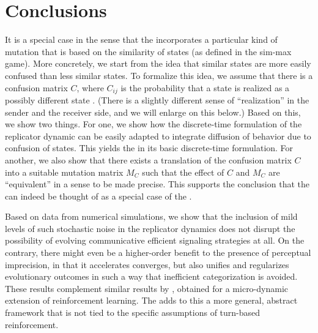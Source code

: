 \section{Conclusions}
\label{sec:conclusions}

It is a special case in the sense that the \rdd incorporates a
particular kind of mutation that is based on the similarity of states
(as defined in the sim-max game). More concretely, we start from the
idea that similar states are more easily confused than less similar
states. To formalize this idea, we assume that there is a confusion
matrix $C$, where $C_{ij}$ is the probability that a state 
is realized as a possibly different state . (There is a
slightly different sense of ``realization'' in the sender and the
receiver side, and we will enlarge on this below.) Based on this, we
show two things. For one, we show how the discrete-time formulation of
the replicator dynamic can be easily adapted to integrate diffusion of
behavior due to confusion of states. This yields the \rdd in its basic
discrete-time formulation. For another, we also show that there exists
a translation of the confusion matrix $C$ into a suitable mutation
matrix $M_C$ such that the effect of $C$ and $M_C$ are ``equivalent''
in a sense to be made precise. This supports the conclusion that the
\rdd can indeed be thought of as a special case of the \rmd.

Based on data from numerical simulations, we show that the inclusion
of mild levels of such stochastic noise in the replicator dynamics
does not disrupt the possibility of evolving communicative efficient
signaling strategies at all. On the contrary, there might even be a
higher-order benefit to the presence of perceptual imprecision, in
that it accelerates converges, but also unifies and regularizes
evolutionary outcomes in such a way that inefficient categorization is
avoided. These results complement similar results by
\citet{OConnor2013:The-Evolution-o}, obtained for a micro-dynamic
extension of reinforcement learning. The \rdd adds to this a more
general, abstract framework that is not tied to the specific
assumptions of turn-based reinforcement. 




